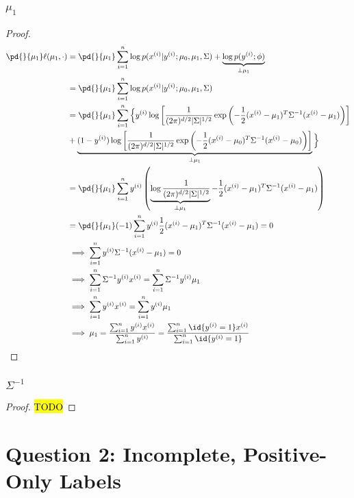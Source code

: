 \documentclass[11pt]{article}
\newcommand{\upi}[0]{^{(i)}}
\begin{document}
	\subsubsection{$\mu_1$}
	\begin{proof}
		\begin{align}
			\pd{}{\mu_1} \ell(\mu_1, \cdot) &= \pd{}{\mu_1} \sum_{i=1}^n
		\log p(x\upi|y\upi; \mu_0, \mu_1, \Sigma)
		+ \underbrace{\log p(y\upi; \phi)}_{\perp \mu_1} \\
		&= \pd{}{\mu_1} \sum_{i=1}^n \log p(x\upi|y\upi; \mu_0, \mu_1, \Sigma) \\
		&= \pd{}{\mu_1} \sum_{i=1}^n \Big\{
		y\upi \log \left [ \frac{1}{(2\pi)^{d/2}|\Sigma|^{1/2}} \exp \left (-\frac{1}{2} (x\upi - \mu_1)^T \Sigma^{-1} (x\upi - \mu_1) \right) \right ] \\
		&+\underbrace{ (1 - y\upi) \log \left [ \frac{1}{(2\pi)^{d/2}|\Sigma|^{1/2}} \exp \left (-\frac{1}{2} (x\upi - \mu_0)^T \Sigma^{-1} (x\upi - \mu_0) \right) \right ]}_{\perp \mu_1}
		\Big\} \\
		&= \pd{}{\mu_1} \sum_{i=1}^n y\upi \left (
		\underbrace{\log \frac{1}{(2\pi)^{d/2}|\Sigma|^{1/2}}}_{\perp \mu_1}
		-\frac{1}{2} (x\upi - \mu_1)^T \Sigma^{-1} (x\upi - \mu_1) \right) \\
		&= \pd{}{\mu_1} (-1) \sum_{i=1}^n y\upi \frac{1}{2} (x\upi - \mu_1)^T \Sigma^{-1} (x\upi - \mu_1) = 0 \\
		&\implies \sum_{i=1}^n y\upi \Sigma^{-1} (x\upi - \mu_1) = 0 \\
		&\implies \sum_{i=1}^n \Sigma^{-1} y\upi x\upi = \sum_{i=1}^n \Sigma^{-1} y\upi \mu_1 \\
		& \implies \sum_{i=1}^n y\upi x\upi = \sum_{i=1}^n y\upi \mu_1 \\
		& \implies \mu_1 = \frac{\sum_{i=1}^n y\upi x\upi}{\sum_{i=1}^n y\upi} = \frac{\sum_{i=1}^n \id{y\upi = 1} x\upi}{\sum_{i=1}^n \id{y\upi = 1}}
	\end{align}
	\end{proof}
	
	\subsubsection{$\Sigma^{-1}$}
	\begin{proof}
		\hl{TODO}
	\end{proof}
	
	\newpage
	\section{Question 2: Incomplete, Positive-Only Labels}
\end{document}
